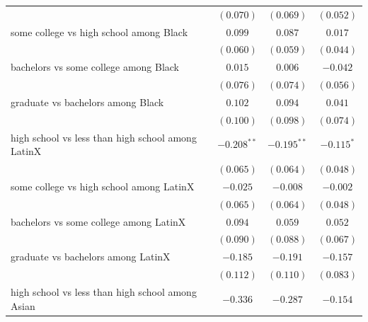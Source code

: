 \documentclass[
  12pt,
  letterpaper,
]{article}
\begin{document}
\begin{table}
\begin{center}
\begin{tabular}{l c c c c}
                                                     &                & $(0.070)$      & $(0.069)$      & $(0.052)$      \\
some college vs high school among Black              &                & $0.099$        & $0.087$        & $0.017$        \\
                                                     &                & $(0.060)$      & $(0.059)$      & $(0.044)$      \\
bachelors vs some college among Black                &                & $0.015$        & $0.006$        & $-0.042$       \\
                                                     &                & $(0.076)$      & $(0.074)$      & $(0.056)$      \\
graduate vs bachelors among Black                    &                & $0.102$        & $0.094$        & $0.041$        \\
                                                     &                & $(0.100)$      & $(0.098)$      & $(0.074)$      \\
high school vs less than high school among LatinX    &                & $-0.208^{**}$  & $-0.195^{**}$  & $-0.115^{*}$   \\
                                                     &                & $(0.065)$      & $(0.064)$      & $(0.048)$      \\
some college vs high school among LatinX             &                & $-0.025$       & $-0.008$       & $-0.002$       \\
                                                     &                & $(0.065)$      & $(0.064)$      & $(0.048)$      \\
bachelors vs some college among LatinX               &                & $0.094$        & $0.059$        & $0.052$        \\
                                                     &                & $(0.090)$      & $(0.088)$      & $(0.067)$      \\
graduate vs bachelors among LatinX                   &                & $-0.185$       & $-0.191$       & $-0.157$       \\
                                                     &                & $(0.112)$      & $(0.110)$      & $(0.083)$      \\
high school vs less than high school among Asian     &                & $-0.336$       & $-0.287$       & $-0.154$       \\

\end{tabular}
\end{center}
\end{table}
\end{document}
